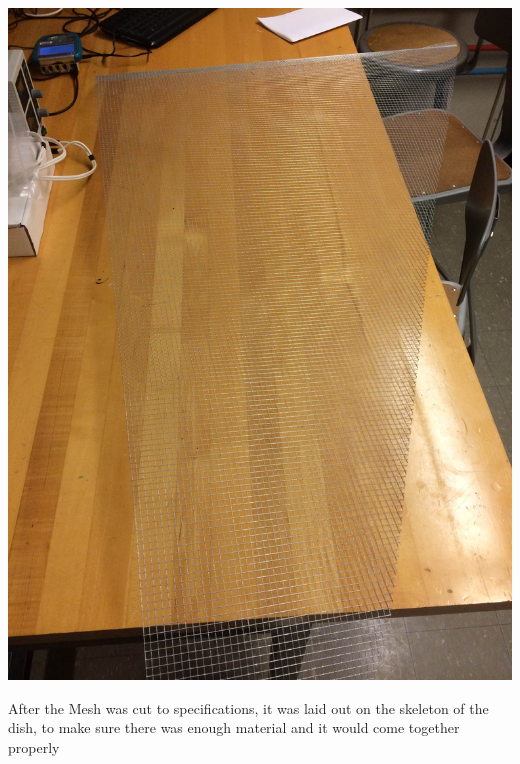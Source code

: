 \documentclass[11pt]{article} %
\begin{document}
\begin{center}
\includegraphics[scale=0.12]{dish/11.jpeg}
\end{center}


After the Mesh was cut to specifications, it was laid out on the skeleton of the dish, to make sure there was enough material and it would come together properly
\end{document}
